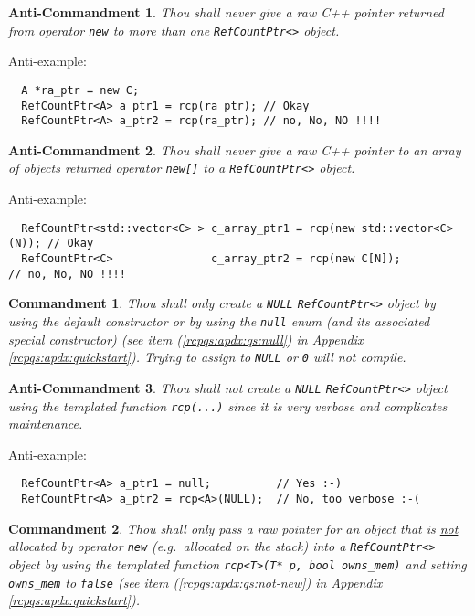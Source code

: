 \documentclass[pdf,ps2pdf,11pt]{SANDreport}
\newtheorem{commandment}{Commandment}
\newtheorem{anticommandment}{Anti-Commandment}
\begin{document}
\begin{anticommandment}
Thou shall never give a raw C++ pointer returned from operator
{}\texttt{new} to more than one {}\texttt{Ref\-Count\-Ptr<>} object.
\end{anticommandment}

{}\noindent{}Anti-example:
{\small\begin{verbatim}
  A *ra_ptr = new C;
  RefCountPtr<A> a_ptr1 = rcp(ra_ptr); // Okay
  RefCountPtr<A> a_ptr2 = rcp(ra_ptr); // no, No, NO !!!!
\end{verbatim}}

\begin{anticommandment}
Thou shall never give a raw C++ pointer to an array of objects
returned operator {}\texttt{new[]} to a {}\texttt{Ref\-Count\-Ptr<>}
object.
\end{anticommandment}

{}\noindent{}Anti-example:
{\small\begin{verbatim}
  RefCountPtr<std::vector<C> > c_array_ptr1 = rcp(new std::vector<C>(N)); // Okay
  RefCountPtr<C>               c_array_ptr2 = rcp(new C[N]);              // no, No, NO !!!!
\end{verbatim}}

\begin{commandment}
Thou shall only create a {}\texttt{NULL} {}\texttt{Ref\-Count\-Ptr<>}
object by using the default constructor or by using the
{}\texttt{null} enum (and its associated special constructor) (see
item ({}\ref{rcpqs:apdx:qs:null}) in Appendix
{}\ref{rcpqs:apdx:quickstart}).  Trying to assign to {}\texttt{NULL}
or {}\texttt{0} will not compile.
\end{commandment}

\begin{anticommandment}
Thou shall not create a {}\texttt{NULL} {}\texttt{Ref\-Count\-Ptr<>}
object using the templated function {}\texttt{rcp(...)} since it is
very verbose and complicates maintenance.
\end{anticommandment}

{}\noindent{}Anti-example:
{\small\begin{verbatim}
  RefCountPtr<A> a_ptr1 = null;          // Yes :-)
  RefCountPtr<A> a_ptr2 = rcp<A>(NULL);  // No, too verbose :-(
\end{verbatim}}

\begin{commandment}
Thou shall only pass a raw pointer for an object that is
{}\underline{not} allocated by operator {}\texttt{new} (e.g.~allocated
on the stack) into a {}\texttt{Ref\-Count\-Ptr<>} object by using the
templated function {}\texttt{rcp<T>(T* p, bool owns\_mem)} and setting
{}\texttt{owns\_mem} to {}\texttt{false} (see item
({}\ref{rcpqs:apdx:qs:not-new}) in Appendix
{}\ref{rcpqs:apdx:quickstart}).
\end{commandment}
\end{document}
